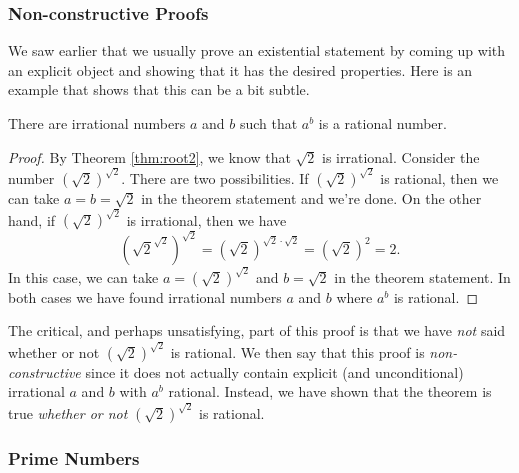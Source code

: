 \subsubsection*{Non-constructive Proofs}

We saw earlier that we usually prove an existential statement by coming up with an explicit object and showing that it has the desired properties.
Here is an example that shows that this can be a bit subtle.
\begin{thm}
    There are irrational numbers $a$ and $b$ such that $a^b$ is a rational number.
\end{thm}
\begin{proof}
    By Theorem \ref{thm:root2}, we know that $\sqrt{2}$ is irrational.
    Consider the number $(\sqrt{2})^{\sqrt 2}$.
    There are two possibilities.
    If $(\sqrt{2})^{\sqrt 2}$ is rational, then we can take $a = b = \sqrt 2$ in the theorem statement and we're done.
    On the other hand, if $(\sqrt{2})^{\sqrt 2}$ is irrational, then we have
    \[
        \left(\sqrt{2}^{\sqrt 2}\right)^{\sqrt 2} = (\sqrt 2)^{\sqrt 2\cdot \sqrt 2} = (\sqrt 2)^2 = 2.
    \]
    In this case, we can take $a = (\sqrt 2)^{\sqrt 2}$ and $b = \sqrt 2$ in the theorem statement.
    In both cases we have found irrational numbers $a$ and $b$ where $a^b$ is rational.
\end{proof}

The critical, and perhaps unsatisfying, part of this proof is that we have \emph{not} said whether or not $(\sqrt 2)^{\sqrt 2}$ is rational.
We then say that this proof is \emph{non-constructive} since it does not actually contain explicit (and unconditional) irrational $a$ and $b$ with $a^b$ rational.
Instead, we have shown that the theorem is true \emph{whether or not} $(\sqrt 2)^{\sqrt 2}$ is rational.
\subsubsection*{Prime Numbers}

